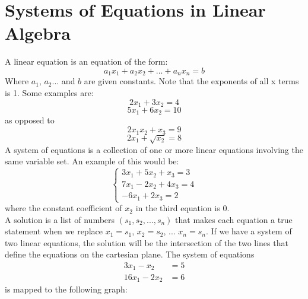 \documentclass[nobib]{tufte-handout}
\begin{document}
\section{Systems of Equations in Linear Algebra}
A linear equation is an equation of the form:
\begin{equation*}
    a_1x_1+a_2x_2+...+a_nx_n=b
\end{equation*}
Where $a_1$, $a_2$... and $b$ are given constants.
Note that the exponents of all x terms is 1.
Some examples are:
\begin{equation*}
    2x_1+3x_2=4
\end{equation*}
\begin{equation*}
    5x_1+6x_2=10
\end{equation*}
as opposed to
\begin{equation*}
    2x_1x_2+x_3=9
\end{equation*}
\begin{equation*}
    2x_1+\sqrt{x_2}=8
\end{equation*}
A system of equations is a collection of one or more linear equations involving the same variable set. 
An example of this would be:
$$ \begin{cases}
3x_1 + 5x_2 + x_3 = 3\\
7x_1 - 2x_2 + 4x_3 = 4\\
-6x_1 + 2x_3 = 2
\end{cases} $$
where the constant coefficient of $x_2$ in the third equation is 0.\\
A solution is a list of numbers $(s_1, s_2, ..., s_n)$ that makes each equation a true statement when we replace $x_1=s_1$, $x_2=s_2$, ... $x_n=s_n$.
If we have a system of two linear equations, the solution will be the intersection of the two lines that define the equations on the cartesian plane. The system of equations
\begin{align*}
    3x_1-x_2 &= 5\\
    16x_1-2x_2 &= 6
\end{align*}
is mapped to the following graph:
\begin{center}
\end{center}
\end{document}
